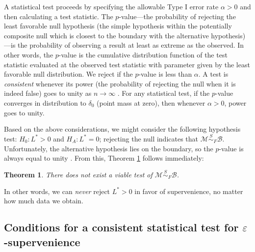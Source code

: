 \documentclass{article}
\newtheorem{thm}{Theorem}
\newcommand{\eps}{\varepsilon}
\newcommand{\conv}{\rightarrow}
\newcommand{\mB}{\mathcal{B}}
\newcommand{\mM}{\mathcal{M}}
\newcommand{\MsB}{\mM \overset{S}{\sim}_{F} \mB}
\begin{document}
A statistical test proceeds by 
specifying the allowable Type I error rate $\alpha>0$ and then
calculating a 
test statistic.
The $p$-value---the probability of rejecting the least favorable null hypothesis (the simple hypothesis within the potentially composite null which is closest to the boundary with the alternative hypothesis)---is the probability of observing a result at least as extreme as the observed.  In other words, the $p$-value is the cumulative distribution function of the test statistic evaluated at the observed test statistic with parameter given by the least favorable null distribution.
We reject if 
the $p$-value 
is less than $\alpha$.   A test is \emph{consistent} whenever its power  (the probability of rejecting the null when it is indeed false)  goes to unity as $n\conv \infty$ . For any statistical test, if the $p$-value converges in distribution to $\delta_0$ (point mass at zero), then whenever $\alpha >0$, power goes to unity. 

Based on the above considerations,
we might consider the following hypothesis test: $H_0: L^*>0$ and $H_A: L^*=0$; rejecting the null indicates that $\MsB$. Unfortunately, 
the alternative hypothesis lies on the boundary, so the $p$-value is always equal to unity \cite{Bickel2000}.  From this, Theorem \ref{thm:2} follows immediately:
\begin{thm} \label{thm:2}
	There does not exist a viable test of $\MsB$.
\end{thm}

In other words, we can \emph{never} reject $L^*>0$ in favor of supervenience, no matter how much data we obtain.  

\subsection*{Conditions for a consistent statistical test for $\eps$-supervenience} %
\end{document}
